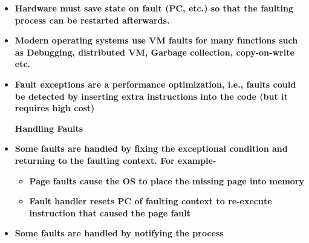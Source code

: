 \documentclass[12pt]{article}
\begin{document}
\begin{itemize}
	\item {\fontsize{16pt}{19.2pt}\selectfont \textbf{Hardware must save state on fault (PC, etc.) so that the faulting process can be restarted afterwards.}\par}\par

	\item {\fontsize{16pt}{19.2pt}\selectfont \textbf{Modern operating systems use VM faults for many functions such as Debugging, distributed VM, Garbage collection, copy-on-write etc.}\par}\par

	\item {\fontsize{16pt}{19.2pt}\selectfont \textbf{Fault exceptions are a performance optimization, i.e., faults could be detected by inserting extra instructions into the code (but it requires high cost)}\par}\par


\vspace{\baselineskip}
{\fontsize{24pt}{28.8pt}\selectfont \textbf{Handling Faults}\par}\par

	\item {\fontsize{16pt}{19.2pt}\selectfont \textbf{Some faults are handled by fixing the exceptional condition and returning to the faulting context. For example-}\par}\par

\begin{itemize}
	\item {\fontsize{16pt}{19.2pt}\selectfont \textbf{Page faults cause the OS to place the missing page into memory}\par}\par

	\item {\fontsize{16pt}{19.2pt}\selectfont \textbf{Fault handler resets PC of faulting context to re-execute instruction that caused the page fault}\par}
\end{itemize}\par

	\item {\fontsize{16pt}{19.2pt}\selectfont \textbf{Some faults are handled by notifying the process}\par}\par


\end{itemize}
\end{document}
